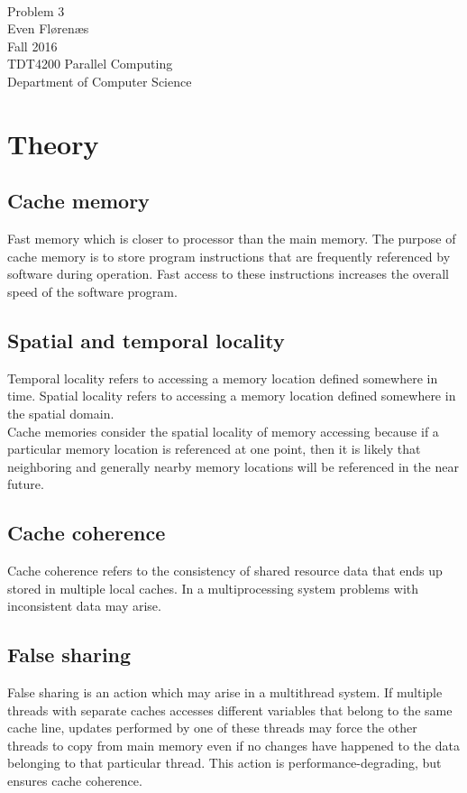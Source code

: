\documentclass[12pt]{article}
\begin{document}
\thispagestyle{empty}
\mbox{}\\[6pc]
\begin{center}
\Huge{Problem 3}\\[2pc]

\Large{Even Flørenæs}\\[1pc]
\Large{Fall 2016}\\[2pc]

TDT4200 Parallel Computing\\
Department of Computer Science
\end{center}
\vfill

\newpage
\tableofcontents
\newpage
\section{Theory}
\subsection{Cache memory}
Fast memory which is closer to processor than the main memory. The purpose of cache memory is to store program instructions that are frequently referenced by software during operation. Fast access to these instructions increases the overall speed of the software program.
\subsection{Spatial and temporal locality}
Temporal locality refers to accessing a memory location defined somewhere in time. Spatial locality refers to accessing a memory location defined somewhere in the spatial domain.
\\[10pt]
Cache memories consider the spatial locality of memory accessing because if a particular memory location is referenced at one point, then it is likely that neighboring and generally nearby memory locations will be referenced in the near future.
\subsection{Cache coherence}
Cache coherence refers to the consistency of shared resource data that ends up stored in multiple local caches. In a multiprocessing system problems with inconsistent data may arise.
\subsection{False sharing}
False sharing is an action which may arise in a multithread system. If multiple threads with separate caches accesses different variables that belong to the same cache line, updates performed by one of these threads may force the other threads to copy from main memory even if no changes have happened to the data belonging to that particular thread. This action is performance-degrading, but ensures cache coherence.
\end{document}
